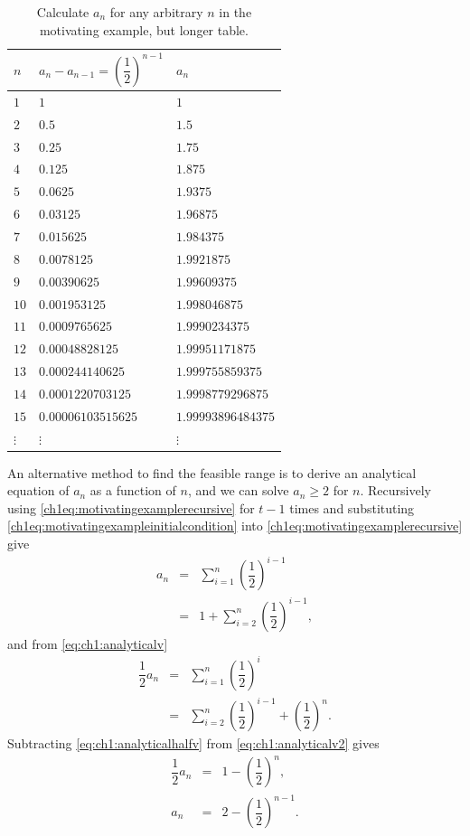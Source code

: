 \begin{table}[ht]
\caption {Calculate $a_n$ for any arbitrary $n$ in the motivating example, but longer table.} \label{chi1table:largean}
\begin{tabular}{lll}
$n$    & $a_n - a_{n-1}=\left(\dfrac{1}{2}\right)^{n-1}$ & $a_n$ \\ \hline
$1$ & $1$ & $1$ \\
$2$ & $0.5$ & $1.5$ \\
$3$ & $0.25$ & $1.75$ \\
$4$ & $0.125$ & $1.875$ \\
$5$ & $0.0625$ & $1.9375$ \\
$6$ & $0.03125$ & $1.96875$ \\
$7$ & $0.015625$ & $1.984375$ \\
$8$ & $0.0078125$ & $1.9921875$ \\
$9$ & $0.00390625$ & $1.99609375$ \\
$10$ & $0.001953125$ & $1.998046875$ \\
$11$ & $0.0009765625$ & $1.9990234375$ \\
$12$ & $0.00048828125$ & $1.99951171875$ \\
$13$ & $0.000244140625$ & $1.999755859375$ \\
$14$ & $0.0001220703125$ & $1.9998779296875$ \\
$15$ & $0.00006103515625$ & $1.99993896484375$ \\
$\vdots$ & $\vdots$ & $\vdots$ \\ \hline
\end{tabular}
\end{table}

An alternative method to find the feasible range is to derive an analytical equation of $a_n$ as a function of $n$, and we can solve $a_n\geq 2$ for $n$. Recursively using \eqref{ch1eq:motivatingexamplerecursive} for $t-1$ times and substituting \eqref{ch1eq:motivatingexampleinitialcondition} into \eqref{ch1eq:motivatingexamplerecursive} give
\begin{eqnarray}
  a_n &=& \sum_{i=1}^{n} \left(\dfrac{1}{2}\right)^{i-1} \label{eq:ch1:analyticalv} \\
  &=& 1 + \sum_{i=2}^{n} \left(\dfrac{1}{2}\right)^{i-1}, \label{eq:ch1:analyticalv2}
\end{eqnarray}
and from \eqref{eq:ch1:analyticalv}
\begin{eqnarray}
  \dfrac{1}{2}a_n &=& \sum_{i=1}^{n} \left(\dfrac{1}{2}\right)^{i} \nonumber \\
  &=& \sum_{i=2}^{n} \left(\dfrac{1}{2}\right)^{i-1} + \left(\dfrac{1}{2}\right)^{n}. \label{eq:ch1:analyticalhalfv}
\end{eqnarray}
Subtracting \eqref{eq:ch1:analyticalhalfv} from \eqref{eq:ch1:analyticalv2} gives
\begin{eqnarray}
  \dfrac{1}{2}a_n &=& 1 - \left(\dfrac{1}{2}\right)^{n}, \nonumber \\
  a_n &=& 2 - \left(\dfrac{1}{2}\right)^{n-1}. \label{eq:ch1:analyticalvresult}
\end{eqnarray}

